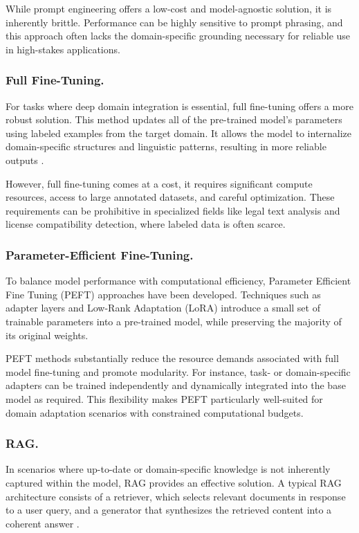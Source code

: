 While prompt engineering offers a low-cost and model-agnostic solution, it is inherently brittle. Performance can be highly sensitive to prompt phrasing, and this approach often lacks the domain-specific grounding necessary for reliable use in high-stakes applications.

\subsubsection{Full Fine-Tuning.}

For tasks where deep domain integration is essential, full fine-tuning offers a more robust solution. This method updates all of the pre-trained model’s parameters using labeled examples from the target domain. It allows the model to internalize domain-specific structures and linguistic patterns, resulting in more reliable outputs \cite{chowdhery2022palm}.

However, full fine-tuning comes at a cost, it requires significant compute resources, access to large annotated datasets, and careful optimization. These requirements can be prohibitive in specialized fields like legal text analysis and license compatibility detection, where labeled data is often scarce.

\subsubsection{Parameter-Efficient Fine-Tuning.}

To balance model performance with computational efficiency, Parameter Efficient Fine Tuning (PEFT) approaches have been developed. Techniques such as adapter layers \cite{houlsby2019parameter} and Low-Rank Adaptation (LoRA) \cite{hu2022lora} introduce a small set of trainable parameters into a pre-trained model, while preserving the majority of its original weights.

PEFT methods substantially reduce the resource demands associated with full model fine-tuning and promote modularity. For instance, task- or domain-specific adapters can be trained independently and dynamically integrated into the base model as required. This flexibility makes PEFT particularly well-suited for domain adaptation scenarios with constrained computational budgets.


\subsubsection{RAG.}


In scenarios where up-to-date or domain-specific knowledge is not inherently captured within the model, RAG provides an effective solution. A typical RAG architecture consists of a retriever, which selects relevant documents in response to a user query, and a generator that synthesizes the retrieved content into a coherent answer \cite{izacard2022few}.

